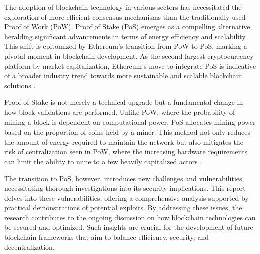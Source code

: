 The adoption of blockchain technology in various sectors has necessitated the exploration of more efficient consensus mechanisms than the traditionally used Proof of Work (PoW). Proof of Stake (PoS) emerges as a compelling alternative, heralding significant advancements in terms of energy efficiency and scalability. This shift is epitomized by Ethereum's transition from PoW to PoS, marking a pivotal moment in blockchain development. As the second-largest cryptocurrency platform by market capitalization, Ethereum's move to integrate PoS is indicative of a broader industry trend towards more sustainable and scalable blockchain solutions \cite{li2019blockchain}.

Proof of Stake is not merely a technical upgrade but a fundamental change in how block validations are performed. Unlike PoW, where the probability of mining a block is dependent on computational power, PoS allocates mining power based on the proportion of coins held by a miner. This method not only reduces the amount of energy required to maintain the network but also mitigates the risk of centralization seen in PoW, where the increasing hardware requirements can limit the ability to mine to a few heavily capitalized actors \cite{nakamoto2008bitcoin}.

The transition to PoS, however, introduces new challenges and vulnerabilities, necessitating thorough investigations into its security implications. This report delves into these vulnerabilities, offering a comprehensive analysis supported by practical demonstrations of potential exploits. By addressing these issues, the research contributes to the ongoing discussion on how blockchain technologies can be secured and optimized. Such insights are crucial for the development of future blockchain frameworks that aim to balance efficiency, security, and decentralization.